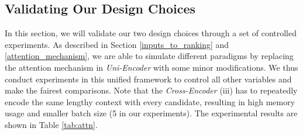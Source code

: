 

\subsection{Validating Our Design Choices}
\label{attn}

In this section, we will validate our two design choices through a set of controlled experiments. As described in Section \ref{inputs_to_ranking} and \ref{attention_mechanism}, we are able to simulate different paradigms by replacing the attention mechanism in \textit{Uni-Encoder} with some minor modifications. We thus conduct experiments in this unified framework to control all other variables and make the fairest comparisons. Note that the \textit{Cross-Encoder} (iii) has to repeatedly encode the same lengthy context with every candidate, resulting in high memory usage and smaller batch size (5 in our experiments). The experimental results are shown in Table \ref{tab:attn}. 

